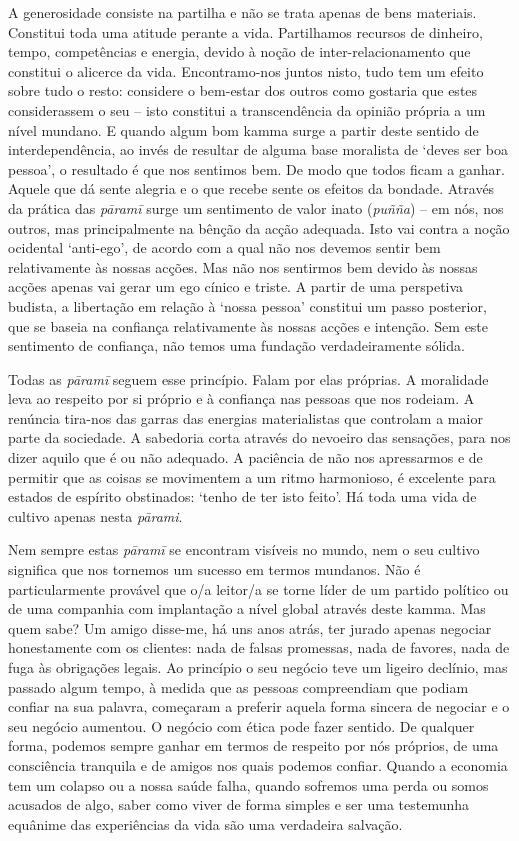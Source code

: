 A generosidade consiste na partilha e não se trata apenas de bens materiais. Constitui toda uma atitude perante a vida. Partilhamos recursos de dinheiro, tempo, competências e energia, devido à noção de inter-relacionamento que constitui o alicerce da vida. Encontramo-nos juntos nisto, tudo tem um efeito sobre tudo o resto: considere o bem-estar dos outros como gostaria que estes considerassem o seu -- isto constitui a transcendência da opinião própria a um nível mundano. E quando algum bom kamma surge a partir deste sentido de interdependência, ao invés de resultar de alguma base moralista de `deves ser boa pessoa', o resultado é que nos sentimos bem. De modo que todos ficam a ganhar. Aquele que dá sente alegria e o que recebe sente os efeitos da bondade. Através da prática das \emph{pāramī} surge um sentimento de valor inato (\emph{puñña}) -- em nós, nos outros, mas principalmente na bênção da acção adequada. Isto vai contra a noção ocidental `anti-ego', de acordo com a qual não nos devemos sentir bem relativamente às nossas acções. Mas não nos sentirmos bem devido às nossas acções apenas vai gerar um ego cínico e triste. A partir de uma perspetiva budista, a libertação em relação à `nossa pessoa' constitui um passo posterior, que se baseia na confiança relativamente às nossas acções e intenção. Sem este sentimento de confiança, não temos uma fundação verdadeiramente sólida.

Todas as \emph{pāramī} seguem esse princípio. Falam por elas próprias. A moralidade leva ao respeito por si próprio e à confiança nas pessoas que nos rodeiam. A renúncia tira-nos das garras das energias materialistas que controlam a maior parte da sociedade. A sabedoria corta através do nevoeiro das sensações, para nos dizer aquilo que é ou não adequado. A paciência de não nos apressarmos e de permitir que as coisas se movimentem a um ritmo harmonioso, é excelente para estados de espírito obstinados: `tenho de ter isto feito'. Há toda uma vida de cultivo apenas nesta \emph{pārami}.

Nem sempre estas \emph{pāramī} se encontram visíveis no mundo, nem o seu cultivo significa que nos tornemos um sucesso em termos mundanos. Não é particularmente provável que o/a leitor/a se torne líder de um partido político ou de uma companhia com implantação a nível global através deste kamma. Mas quem sabe? Um amigo disse-me, há uns anos atrás, ter jurado apenas negociar honestamente com os clientes: nada de falsas promessas, nada de favores, nada de fuga às obrigações legais. Ao princípio o seu negócio teve um ligeiro declínio, mas passado algum tempo, à medida que as pessoas compreendiam que podiam confiar na sua palavra, começaram a preferir aquela forma sincera de negociar e o seu negócio aumentou. O negócio com ética pode fazer sentido. De qualquer forma, podemos sempre ganhar em termos de respeito por nós próprios, de uma consciência tranquila e de amigos nos quais podemos confiar. Quando a economia tem um colapso ou a nossa saúde falha, quando sofremos uma perda ou somos acusados de algo, saber como viver de forma simples e ser uma testemunha equânime das experiências da vida são uma verdadeira salvação.

